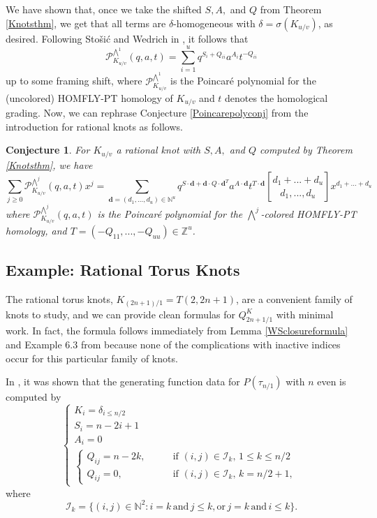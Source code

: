 \documentclass[11pt]{amsart}
\theoremstyle{plain}
\newtheorem{conjectureN}[theoremN]{Conjecture}
\theoremstyle{definition}
\theoremstyle{remark}
\begin{document}
We have shown that, once we take the shifted $S,A,$ and $Q$ from Theorem \ref{Knotsthm}, we get that all terms are $\delta$-homogeneous with $\delta=\sigma(K_{u/v})$, as desired. Following Sto\v si\'c and Wedrich in \cite{SW21}, it follows that
\[
\mathcal{P}^{\bigwedge^1}_{K_{u/v}}(q,a,t)=\sum_{i=1}^uq^{S_i+Q_{ii}}a^{A_i}t^{-Q_{ii}}
\]
up to some framing shift, where $\mathcal{P}^{\bigwedge^1}_{K_{u/v}}$ is the Poincar\'e polynomial for the (uncolored) HOMFLY-PT homology of $K_{u/v}$ and $t$ denotes the homological grading. Now, we can rephrase Conjecture \ref{Poincarepolyconj} from the introduction for rational knots as follows.

\begin{conjectureN}
    For $K_{u/v}$ a rational knot with $S,A,$ and $Q$  computed by Theorem \ref{Knotsthm}, we have
    \begin{equation}
        \sum_{j\geq 0} \mathcal{P}^{\bigwedge^j}_{K_{u/v}}(q,a,t)x^j=\sum_{\textbf{d}=(d_1,...,d_u)\in\mathbb{N}^u}q^{S\cdot\textbf{d}+\textbf{d}\cdot Q\cdot\textbf{d}^T}a^{A\cdot\textbf{d}}t^{T\cdot \textbf{d}}{d_1+...+d_u\brack d_1,...,d_u}x^{d_1+...+d_u}
    \end{equation}
    where $\mathcal{P}^{\bigwedge^j}_{K_{u/v}}(q,a,t)$ is the Poincar\'e polynomial for the $\bigwedge^j$-colored HOMFLY-PT homology, and $T=(-Q_{11},...,-Q_{uu})\in \mathbb{Z}^u$.
\end{conjectureN}


\subsection{Example: Rational Torus Knots}
\label{rattorusknots}

The rational torus knots, $K_{(2n+1)/1}=T(2,2n+1)$, are a convenient family of knots to study, and we can provide clean formulas for $Q_{2n+1/1}^K$ with minimal work. In fact, the formula follows immediately from Lemma \ref{WSclosureformula} and Example 6.3 from \cite{JHpI26} because none of the complications with inactive indices occur for this particular family of knots.

In \cite{JHpI26}, it was shown that the generating function data for $P(\tau_{n/1})$ with $n$ even is computed by
\[
    \begin{cases}
        K_i = \delta_{i\leq n/2}\\
        S_i=n-2i+1\\
        A_i=0\\
        \begin{cases}
            Q_{ij}=n-2k, \qquad & \text{if} \,\, (i,j)\in\mathcal{I}_k, \,1 \leq k \leq n/2\\
            Q_{ij}=0,\qquad & \text{if} \,\, (i,j)\in\mathcal{I}_k,\, k=n/2+1,
        \end{cases}
    \end{cases}
    \]
where
\[
\mathcal{I}_k=\{(i,j)\in\mathbb{N}^2 : i=k \, \text{and} \, j\leq k, \text{or} \, j=k \, \text{and} \, i\leq k\}.
\]
\end{document}
